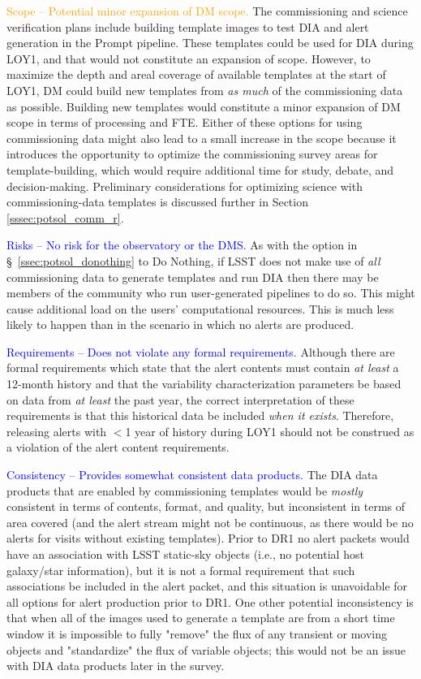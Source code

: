 \documentclass[DM,toc]{lsstdoc}
\begin{document}
\textcolor{orange}{ Scope -- Potential minor expansion of DM scope.} 
The commissioning and science verification plans include building template images to test DIA and alert generation in the Prompt pipeline.
These templates could be used for DIA during LOY1, and that would not constitute an expansion of scope.
However, to maximize the depth and areal coverage of available templates at the start of LOY1, DM could build new templates from {\em as much} of the commissioning data as possible.
Building new templates would constitute a minor expansion of DM scope in terms of processing and FTE.
Either of these options for using commissioning data might also lead to a small increase in the scope because it introduces the opportunity to optimize the commissioning survey areas for template-building, which would require additional time for study, debate, and decision-making.
Preliminary considerations for optimizing science with commissioning-data templates is discussed further in Section \ref{sssec:potsol_comm_r}.

\textcolor{blue}{ Risks -- No risk for the observatory or the DMS.}
As with the option in \S~\ref{ssec:potsol_donothing} to Do Nothing, if LSST does not make use of {\em all} commissioning data to generate templates and run DIA then there may be members of the community who run user-generated pipelines to do so.
This might cause additional load on the users' computational resources.
This is much less likely to happen than in the scenario in which no alerts are produced.

\textcolor{blue}{ Requirements -- Does not violate any formal requirements.}
Although there are formal requirements which state that the alert contents must contain {\em at least} a 12-month history and that the variability characterization parameters be based on data from {\em at least} the past year, the correct interpretation of these requirements is that this historical data be included {\em when it exists}.
Therefore, releasing alerts with $<$1 year of history during LOY1 should not be construed as a violation of the alert content requirements.

\textcolor{blue}{ Consistency -- Provides somewhat consistent data products.}
The DIA data products that are enabled by commissioning templates would be {\em mostly} consistent in terms of contents, format, and quality, but inconsistent in terms of area covered (and the alert stream might not be continuous, as there would be no alerts for visits without existing templates).
Prior to DR1 no alert packets would have an association with LSST static-sky objects (i.e., no potential host galaxy/star information), but it is not a formal requirement that such associations be included in the alert packet, and this situation is unavoidable for all options for alert production prior to DR1.
One other potential inconsistency is that when all of the images used to generate a template are from a short time window it is impossible to fully "remove" the flux of any transient or moving objects and "standardize" the flux of variable objects; this would not be an issue with DIA data products later in the survey.
\end{document}
